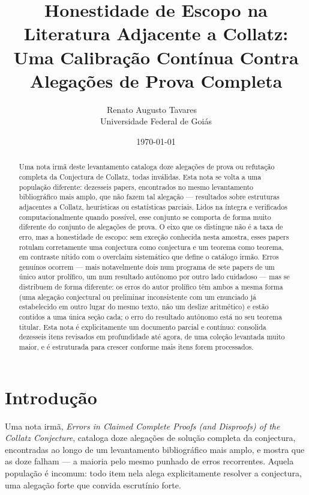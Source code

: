 \documentclass[11pt]{article}
\title{Honestidade de Escopo na Literatura Adjacente a Collatz:\\
Uma Calibração Contínua Contra Alegações de Prova Completa}
\author{Renato Augusto Tavares~{\small\href{mailto:dr.renatotavares@gmail.com}{\textcolor{black}{\faEnvelope}}}~\orcidlink{0009-0002-0196-3311}\\
\normalsize Universidade Federal de Goiás}
\date{\today}
\begin{document}
\maketitle

\begin{abstract}
Uma nota irmã deste levantamento cataloga doze alegações de prova ou
refutação completa da Conjectura de Collatz, todas inválidas. Esta nota
se volta a uma população diferente: dezesseis papers, encontrados no
mesmo levantamento bibliográfico mais amplo, que não fazem tal alegação
--- resultados sobre estruturas adjacentes a Collatz, heurísticas ou
estatísticas parciais. Lidos na íntegra e verificados computacionalmente
quando possível, esse conjunto se comporta de forma muito diferente do
conjunto de alegações de prova. O eixo que os distingue não é a taxa de
erro, mas a honestidade de escopo: sem exceção conhecida nesta amostra,
esses papers rotulam corretamente uma conjectura como conjectura e um
teorema como teorema, em contraste nítido com o overclaim sistemático
que define o catálogo irmão. Erros genuínos ocorrem --- mais
notavelmente dois num programa de sete papers de um único autor
prolífico, um num resultado
autônomo por outro lado cuidadoso --- mas se distribuem de forma
diferente: os erros do autor prolífico têm ambos a mesma forma (uma
alegação conjectural ou preliminar inconsistente com um enunciado já
estabelecido em outro lugar do mesmo texto, não um deslize aritmético)
e estão contidos a uma única seção cada; o erro do resultado autônomo
está no seu teorema titular. Esta nota é
explicitamente um documento parcial e contínuo: consolida dezesseis
itens revisados em profundidade até agora, de uma coleção levantada
muito maior, e é estruturada para crescer conforme mais itens forem
processados.
\end{abstract}

\section{Introdução}
\label{sec:intro}

Uma nota irmã, \emph{Errors in Claimed Complete Proofs (and Disproofs)
of the Collatz Conjecture}, cataloga doze alegações de solução completa
da conjectura, encontradas ao longo de um levantamento bibliográfico
mais amplo, e mostra que as doze falham --- a maioria pelo mesmo
punhado de erros recorrentes. Aquela população é incomum: todo item
nela alega explicitamente resolver a conjectura, uma alegação forte que
convida escrutínio forte.
\end{document}
